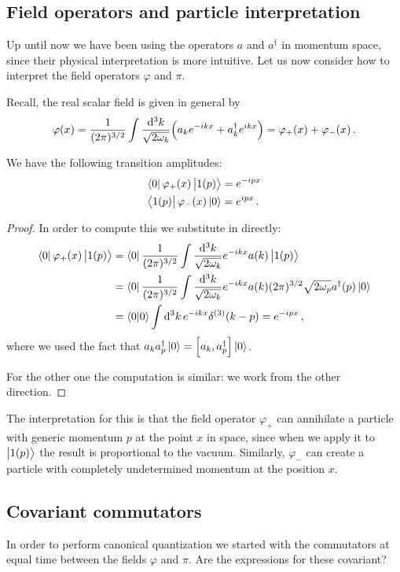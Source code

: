\documentclass[main.tex]{subfiles}
\begin{document}
\subsection{Field operators and particle interpretation}

Up until now we have been using the operators \(a\) and \(a ^\dag\) in momentum space, since their physical interpretation is more intuitive. 
Let us now consider how to interpret the field operators \(\varphi \) and \(\pi \). 

Recall, the real scalar field is given in general by 
%
\begin{align}
\varphi (x) = \frac{1}{(2 \pi )^{3/2}} 
\int \frac{ \dd[3]{k}}{\sqrt{2 \omega_{k}}}
\qty( a_k e^{-ikx} + a ^\dag_{k} e^{ikx}) = \varphi_{+} (x) + \varphi_{-} (x)
\,.
\end{align}

\begin{claim}
We have the following transition amplitudes: 
%
\begin{align}
\bra{0} \varphi_{+} (x) \ket{1(p)} &= e^{-ipx} \\
\bra{1(p)} \varphi_{-} (x) \ket{0} &= e^{ipx}
\,.
\end{align}
\end{claim}

\begin{proof}
In order to compute this we substitute in directly:  
%
\begin{align}
\bra{0} \varphi_{+} (x) \ket{1(p)} &=
\bra{0} \frac{1}{(2 \pi )^{3/2}} 
\int \frac{ \dd[3]{k}}{\sqrt{2 \omega_{k}}} 
e^{-ikx} a(k) \ket{1(p)}  \\
&= \bra{0} \frac{1}{(2 \pi )^{3/2}} 
\int \frac{ \dd[3]{k}}{\sqrt{2 \omega_{k}}} 
e^{-ikx} a(k) (2 \pi )^{3/2} \sqrt{2 \omega_{p}} a ^\dag (p) \ket{0}  \\
&= \braket{0}{0} \int \dd[3]{k} e^{-ikx} \delta^{(3)} (k-p) = e^{-ipx}
\,,
\end{align}
%
where we used the fact that \(a_k a ^\dag_p \ket{0} = \qty[a_k, a ^\dag_p] \ket{0}\).

For the other one the computation is similar: we work from the other direction.
\end{proof}

The interpretation for this is that the field operator \(\varphi_{+}\) can annihilate a particle with generic momentum \(p\) at the point \(x\) in space, since when we apply it to \(\ket{1(p)}\) the result is proportional to the vacuum. Similarly, \(\varphi_{-}\) can create a particle with completely undetermined momentum at the position \(x\). 

\subsection{Covariant commutators}

In order to perform canonical quantization we started with the commutators at equal time between the fields \(\varphi \) and \(\pi \). 
Are the expressions for these covariant? 
\end{document}
